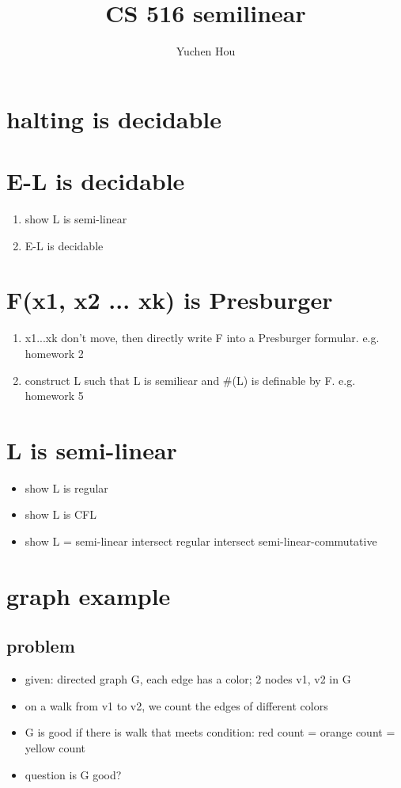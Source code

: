 \documentclass{article}
\begin{document}
\lstset{language=python, tabsize=4}
\title{CS 516 semilinear}
\author{Yuchen Hou}
\maketitle

\section{halting is decidable}

\section{E-L is decidable}
\begin{enumerate}
	\item show L is semi-linear
	\item E-L is decidable
\end{enumerate}

\section{F(x1, x2 ... xk) is Presburger}
\begin{enumerate}
	\item x1...xk don't move, then directly write F into a Presburger formular. e.g. homework 2
	\item construct L such that L is semiliear and \#(L) is definable by F. e.g. homework 5
\end{enumerate}

\section{L is semi-linear}
\begin{itemize}
	\item show L is regular
	\item show L is CFL
	\item show L = semi-linear intersect regular intersect semi-linear-commutative
\end{itemize}

\section{graph example}

\subsection{problem}
\begin{itemize}
	\item given: directed graph G, each edge has a color; 2 nodes v1, v2 in G
	\item on a walk from v1 to v2, we count the edges of different colors
	\item G is good if there is walk that meets condition: red count = orange count = yellow count
	\item question is G good?
\end{itemize}
\end{document}
